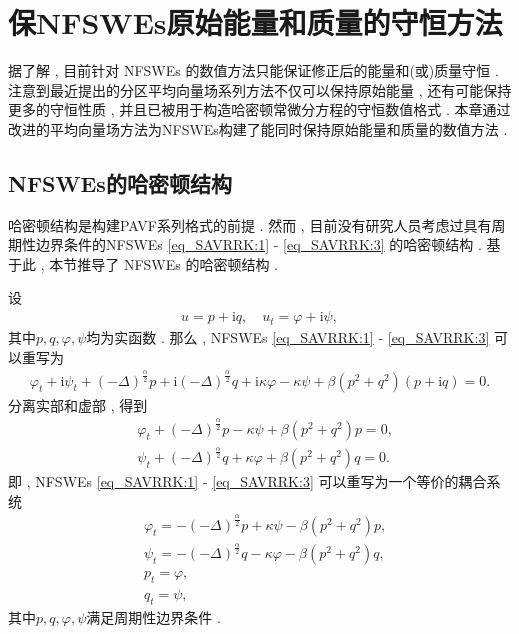\chapter[保NFSWEs原始能量和质量的守恒方法]{保NFSWEs原始能量和质量的守恒方法}
据了解 , 目前针对 NFSWEs 的数值方法只能保证修正后的能量和(或)质量守恒 . 
注意到最近提出的分区平均向量场系列方法不仅可以保持原始能量 , 还有可能保持更多的守恒性质 , 并且已被用于构造哈密顿常微分方程的守恒数值格式\cite{caiPartitionedAveragedVector2018} . 
本章通过改进的平均向量场方法为NFSWEs构建了能同时保持原始能量和质量的数值方法 . 
\section{NFSWEs的哈密顿结构}\label{Section_PAVF: 2_1}

哈密顿结构是构建PAVF系列格式的前提 . 然而 , 目前没有研究人员考虑过具有周期性边界条件的NFSWEs \eqref{eq_SAVRRK:1} - \eqref{eq_SAVRRK:3} 的哈密顿结构 . 
基于此 , 本节推导了 NFSWEs 的哈密顿结构 . 

设
\begin{align}
u = p+\mathrm{i}q , \quad u_t = \varphi+ \mathrm{i}\psi , 
\end{align}
其中$p , q , \varphi , \psi$均为实函数 . 那么 , NFSWEs \eqref{eq_SAVRRK:1} - \eqref{eq_SAVRRK:3} 可以重写为
\begin{align}\label{eq_PAVF:28}
\varphi_{t}+\mathrm{i}\psi_{t}+\left( -\Delta \right) ^{\frac{\alpha }{2}}p+\mathrm{i}\left( -\Delta \right) ^{\frac{\alpha }{2}}q+\mathrm{i}\kappa \varphi-\kappa \psi+\beta \left( p^{2}+q^{2}\right) \left( p+\mathrm{i} q\right) =0 . 
\end{align}
分离实部和虚部 , 得到
\begin{align}
&\varphi_{t}+\left( -\Delta \right) ^{\frac{\alpha }{2}}p-\kappa \psi+\beta \left( p^{2}+q^{2}\right)p=0 , \nonumber\\
&\psi_{t}+\left( -\Delta \right) ^{\frac{\alpha }{2}}q+\kappa \varphi+\beta \left( p^{2}+q^{2}\right)q=0 . \label{eq_PAVF:29}
\end{align}
即 , NFSWEs \eqref{eq_SAVRRK:1} - \eqref{eq_SAVRRK:3} 可以重写为一个等价的耦合系统
\begin{align}
&\varphi_{t}=-\left( -\Delta \right) ^{\frac{\alpha }{2}}p+\kappa \psi-\beta \left( p^{2}+q^{2}\right)p\label{eq_PAVF:30} , \\
&\psi_{t}=-\left( -\Delta \right) ^{\frac{\alpha }{2}}q-\kappa \varphi-\beta \left( p^{2}+q^{2}\right)q\label{eq_PAVF:31} , \\
&p_t=\varphi , \label{eq_PAVF:32}\\
&q_t=\psi , \label{eq_PAVF:33}
\end{align}
其中$p , q , \varphi , \psi$满足周期性边界条件 . 

